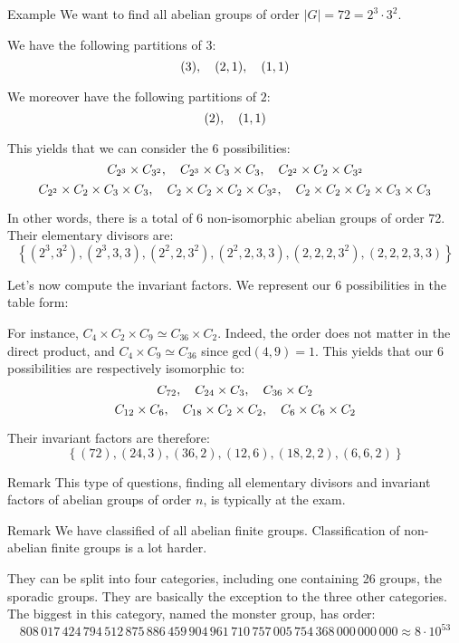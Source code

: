 \documentclass[a4paper]{article}
\begin{document}
\begin{parag}{Example}
    We want to find all abelian groups of order $\left|G\right| = 72 = 2^3 \cdot 3^2$.

    We have the following partitions of $3$: 
    \[\left(3\right), \mathspace \left(2, 1\right), \mathspace \left(1, 1\right)\]
    
    We moreover have the following partitions of $2$: 
    \[\left(2\right), \mathspace \left(1, 1\right)\]
    

    This yields that we can consider the 6 possibilities: 
    \[C_{2^3} \times C_{3^2}, \quad C_{2^3} \times C_3 \times C_3, \quad C_{2^2} \times C_2 \times C_{3^2}\] 
    \[C_{2^2} \times C_{2} \times C_3 \times C_3, \quad C_2 \times C_2 \times C_2 \times C_{3^2}, \quad C_2 \times C_2 \times C_2 \times C_3 \times C_3\]
    
    In other words, there is a total of 6 non-isomorphic abelian groups of order 72. Their elementary divisors are: 
    \[\left\{\left(2^3, 3^2\right), \left(2^3, 3, 3\right), \left(2^2, 2, 3^2\right), \left(2^2, 2, 3, 3\right), \left(2, 2, 2, 3^2\right), \left(2, 2, 2, 3, 3\right)\right\}\]

    Let's now compute the invariant factors. We represent our 6 possibilities in the table form:

    For instance, $C_4 \times C_2 \times C_9 \simeq C_{36} \times C_2$. Indeed, the order does not matter in the direct product, and $C_4 \times C_9 \simeq C_{36}$ since $\text{gcd}\left(4, 9\right) = 1$. This yields that our 6 possibilities are respectively isomorphic to: 
    \[C_{72}, \quad C_{24} \times C_3, \quad C_{36} \times C_2\]
    \[C_{12} \times C_6, \quad C_{18} \times C_2 \times C_2, \quad C_6 \times C_6 \times C_2\]
    
    Their invariant factors are therefore: 
    \[\left\{\left(72\right), \left(24, 3\right), \left(36, 2\right), \left(12, 6\right), \left(18, 2, 2\right), \left(6, 6, 2\right)\right\}\]
    
    \begin{subparag}{Remark}
        This type of questions, finding all elementary divisors and invariant factors of abelian groups of order $n$, is typically at the exam.
    \end{subparag}
\end{parag}

\begin{parag}{Remark}
    We have classified of all abelian finite groups. Classification of non-abelian finite groups is a lot harder.

    They can be split into four categories, including one containing 26 groups, the sporadic groups. They are basically the exception to the three other categories. The biggest in this category, named the monster group, has order:
    \[808\,017\,424\,794\,512\,875\,886\,459\,904\,961\,710\,757\,005\,754\,368\,000\,000\,000 \approx 8\cdot 10^{53}\]
\end{parag}
\end{document}
